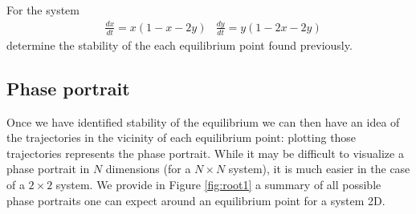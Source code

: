  \begin{Exercise}
For the system
\[ \begin{aligned}
&\displaystyle \frac{dx}{dt} = x \left( 1 -x - 2y \right)  
&\displaystyle \frac{dy}{dt} = y \left( 1 -2x -2 y \right) 
\end{aligned}
\]
determine the stability of the each equilibrium point found previously.\\
  \dotfill

\dotfill

\dotfill

\dotfill

\dotfill

\dotfill

\dotfill

\dotfill

\dotfill

\dotfill
 \end{Exercise}

\subsection{Phase portrait}
Once we have identified stability of the equilibrium we can then have an idea of the trajectories in the vicinity of each equilibrium point: plotting those trajectories represents the phase portrait. While it may be difficult to visualize a phase portrait in $N$ dimensions (for a $N \times N$ system), it is much easier in the case of a $2 \times 2$ system. We provide in Figure \ref{fig:root1} a summary of all possible phase portraits one can expect around an equilibrium point for a system 2D.\\


